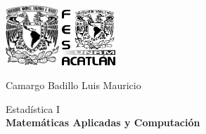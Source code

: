 \begin{titlepage}
    \begin{center}
        \includegraphics[width=0.15\textwidth]{assets/unam.png}
        \hspace{0.6\textwidth}
        \includegraphics[width=0.15\textwidth]{assets/fes.png}

        \vspace*{5cm}
        \LARGE
        \textbf{\titulo}

        \vspace{1cm}
        \large
        Camargo Badillo Luis Mauricio \\
        \vspace{0.5cm}
        \textit{\fecha}

        \vfill

        \vspace{0.5cm}
        Estadística I \\
        \textbf{Matemáticas Aplicadas y Computación}\\
    \end{center}
\end{titlepage}
